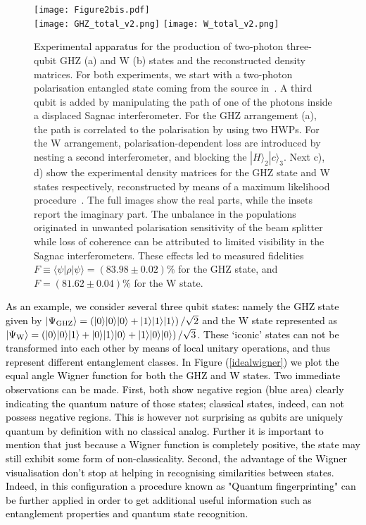\documentclass[pra,reprint,showkeys,showpacs,times,superscriptaddress]{revtex4-1}
\def\ket#1{ | #1 \rangle}
\def\bra#1{{\langle #1 |  }}
\newcommand{\red}{\textcolor{black}}
\begin{document}
\begin{figure*}[t]
\texttt{[image: Figure2bis.pdf]}\\
\texttt{[image: GHZ\_total\_v2.png]}
\texttt{[image: W\_total\_v2.png]}
\caption{Experimental \red{apparatus} for the production of two-photon three-qubit GHZ (a) and W (b) states and the reconstructed density matrices. For both experiments, we start with a two-photon polarisation entangled state coming from the source in~\cite{Ciampini17}. A third qubit is added by manipulating the path of one of the photons inside a displaced Sagnac interferometer. For the GHZ arrangement (a), the path is correlated to the polarisation by using two HWPs. For the W arrangement, polarisation-dependent loss are introduced by nesting a second interferometer, and blocking the $\ket{H}_2\ket{c}_3$. Next c), d) show the  experimental density matrices for the GHZ state and W states respectively, reconstructed by means of a maximum likelihood procedure~\cite{White99}. The full images show the real parts, while the insets report the imaginary part. The unbalance in the populations originated in unwanted polarisation sensitivity of the beam splitter while loss of coherence can be attributed to limited visibility in the Sagnac interferometers. These effects led to measured fidelities $F \equiv \bra{\psi} \rho \ket{\psi} =(83.98\pm0.02)\%$ for the GHZ state, and $F=(81.62\pm0.04)\%$ for the W state.}
\label{figure2}
\end{figure*}

\red{As an example, we consider several three qubit states: namely the GHZ state given by $\ket{\Psi_{\rm{GHZ}}}=\left(|0\rangle |0\rangle |0\rangle + |1\rangle |1\rangle |1\rangle\right)/\sqrt{2}$ and the W state represented as $\ket{\Psi_{\rm{W}}}=\left(|0\rangle |0\rangle |1\rangle + |0\rangle |1\rangle |0\rangle+ |1\rangle |0\rangle |0\rangle\right)/\sqrt{3}$. These `iconic' states can not be transformed into each other by means of local unitary operations, and thus represent different entanglement classes.  In Figure (\ref{idealwigner}) we plot the equal angle Wigner function for both the GHZ and W states. Two immediate observations can be made. First, both show negative region (blue area) clearly indicating the quantum nature of those states; classical states, indeed, can not possess negative regions. This is however not surprising as qubits are uniquely quantum by definition with no classical analog. Further it is important to mention that just because a Wigner function is completely positive, the state may still exhibit some form of non-classicality. Second, the advantage of the Wigner visualisation don't stop at helping in recognising similarities between states. Indeed, in this configuration a procedure known as "Quantum fingerprinting" can be further applied in order to get additional useful information such as entanglement properties and quantum state recognition.}
\end{document}
